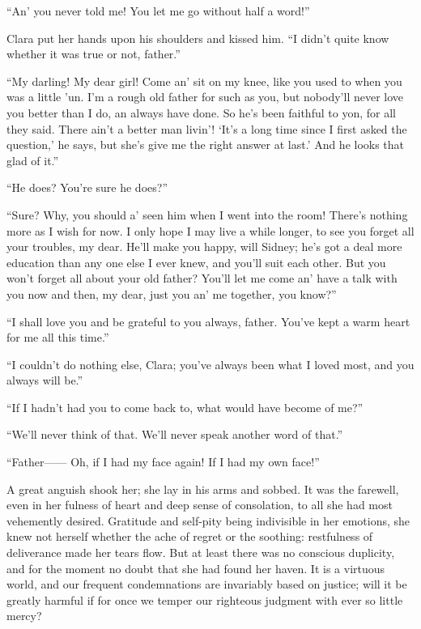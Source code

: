 ``An' you never told me! You let me go without half a word!''

Clara put her hands upon his shoulders and kissed him. ``I didn't quite
know whether it was true or not, father.''

``My darling! My dear girl! Come an' sit on my knee, like you used to
when you was a little 'un. I'm a rough old father for such as you, but
nobody'll never love you {\protect\hypertarget{118}{}{}}better than I
do, an always have done. So he's been faithful to yon, for all they
said. There ain't a better man livin'! `It's a long time since I first
asked the question,' he says, but she's give me the right answer at
last.' And he looks that glad of it.''

``He does? You're sure he does?''

``Sure? Why, you should a' seen him when I went into the room! There's
nothing more as I wish for now. I only hope I may live a while longer,
to see you forget all your troubles, my dear. He'll make you happy, will
Sidney; he's got a deal more education than any one else I ever knew,
and you'll suit each other. But you won't forget all about your old
father? You'll let me come an' have a talk with you now and then, my
dear, just you an' me together, you know?''

``I shall love you and be grateful to you always, father. You've kept a
warm heart for me all this time.''

``I couldn't do nothing else, Clara; you've always been what I loved
most, and you always will be.''

``If I hadn't had you to come back to, what would have become of me?''

{\protect\hypertarget{119}{}{}}``We'll never think of that. We'll never
speak another word of that.''

``Father{{------}} Oh, if I had my face again! If I had my own face!''

A great anguish shook her; she lay in his arms and sobbed. It was the
farewell, even in her fulness of heart and deep sense of consolation, to
all she had most vehemently desired. Gratitude and self-pity being
indivisible in her emotions, she knew not herself whether the ache of
regret or the soothing: restfulness of deliverance made her tears flow.
But at least there was no conscious duplicity, and for the moment no
doubt that she had found her haven. It is a virtuous world, and our
frequent condemnations are invariably based on justice; will it be
greatly harmful if for once we temper our righteous judgment with ever
so little mercy?
